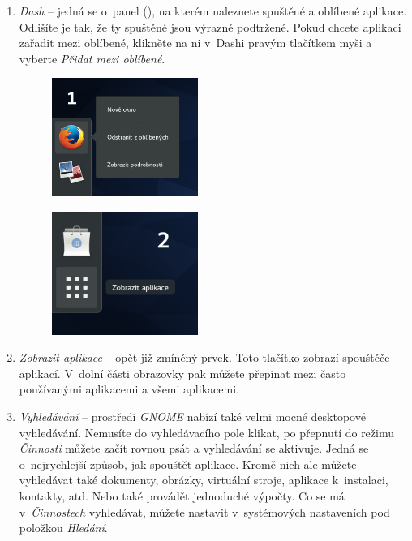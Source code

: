 \begin{enumerate}
\item \emph{Dash} -- jedná se o~panel (), na kterém naleznete spuštěné a oblíbené aplikace. Odlišíte je tak, že ty spuštěné jsou výrazně podtržené. Pokud chcete aplikaci zařadit mezi oblíbené, klikněte na ni v~Dashi pravým tlačítkem myši a vyberte \emph{Přidat mezi oblíbené}.

\begin{figure}[h]
\begin{center}
\includegraphics[width=0.45\textwidth]{img/dash-b}
 \label{fig:dash-b}
\end{center}
\end{figure}

\begin{figure}[h]
\begin{center}
\includegraphics[width=0.45\textwidth]{img/dash-a}
 \label{fig:dash-a}
\end{center}
\end{figure}

\item \emph{Zobrazit aplikace} -- opět již zmíněný prvek. Toto tlačítko zobrazí spouštěče aplikací. V~dolní části obrazovky pak můžete přepínat mezi často používanými aplikacemi a všemi aplikacemi.

\pagebreak

\item \emph{Vyhledávání} -- prostředí \emph{GNOME} nabízí také velmi mocné desktopové vyhledávání. Nemusíte do vyhledávacího pole klikat, po přepnutí do režimu \emph{Činnosti} můžete začít rovnou psát a vyhledávání se aktivuje. Jedná se o~nejrychlejší způsob, jak spouštět aplikace. Kromě nich ale můžete vyhledávat také dokumenty, obrázky, virtuální stroje, aplikace k~instalaci, kontakty, atd. Nebo také provádět jednoduché výpočty. Co se má v~\emph{Činnostech} vyhledávat, můžete nastavit v~systémových nastaveních pod položkou \emph{Hledání}.


\end{enumerate}
